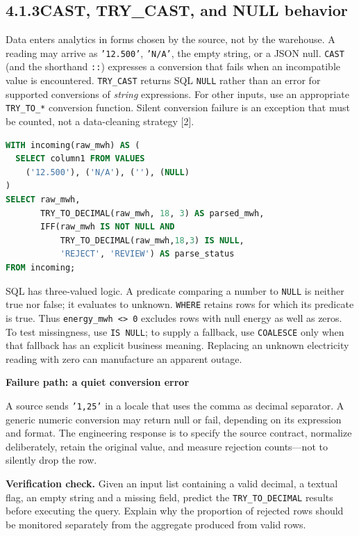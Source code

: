 \documentclass[11pt,twoside]{article}
\newcommand{\topic}[2]{\subsection*{#1\quad #2}}
\begin{document}
\newpage
\topic{4.1.3}{CAST, TRY\_CAST, and NULL behavior}
Data enters analytics in forms chosen by the source, not by the warehouse. A reading may arrive as \texttt{'12.500'}, \texttt{'N/A'}, the empty string, or a JSON null. \texttt{CAST} (and the shorthand \texttt{::}) expresses a conversion that fails when an incompatible value is encountered. \texttt{TRY\_CAST} returns SQL \texttt{NULL} rather than an error for supported conversions of \emph{string} expressions. For other inputs, use an appropriate \texttt{TRY\_TO\_*} conversion function. Silent conversion failure is an exception that must be counted, not a data-cleaning strategy [2].

\begin{lstlisting}[language=SQL,caption={Do not equate an invalid value with zero.}]
WITH incoming(raw_mwh) AS (
  SELECT column1 FROM VALUES
    ('12.500'), ('N/A'), (''), (NULL)
)
SELECT raw_mwh,
       TRY_TO_DECIMAL(raw_mwh, 18, 3) AS parsed_mwh,
       IFF(raw_mwh IS NOT NULL AND
           TRY_TO_DECIMAL(raw_mwh,18,3) IS NULL,
           'REJECT', 'REVIEW') AS parse_status
FROM incoming;
\end{lstlisting}

SQL has three-valued logic. A predicate comparing a number to \texttt{NULL} is neither true nor false; it evaluates to unknown. \texttt{WHERE} retains rows for which its predicate is true. Thus \texttt{energy\_mwh <> 0} excludes rows with null energy as well as zeros. To test missingness, use \texttt{IS NULL}; to supply a fallback, use \texttt{COALESCE} only when that fallback has an explicit business meaning. Replacing an unknown electricity reading with zero can manufacture an apparent outage.

\begin{insight}\textbf{Failure path: a quiet conversion error}\par
A source sends \texttt{'1,25'} in a locale that uses the comma as decimal separator. A generic numeric conversion may return null or fail, depending on its expression and format. The engineering response is to specify the source contract, normalize deliberately, retain the original value, and measure rejection counts---not to silently drop the row.\end{insight}

\textbf{Verification check.} Given an input list containing a valid decimal, a textual flag, an empty string and a missing field, predict the \texttt{TRY\_TO\_DECIMAL} results before executing the query. Explain why the proportion of rejected rows should be monitored separately from the aggregate produced from valid rows.
\end{document}
